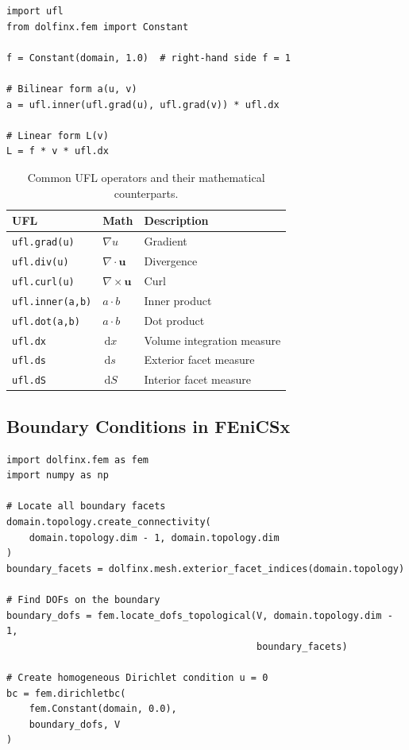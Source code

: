 \documentclass[11pt]{article}
\newcommand{\dx}{\,\mathrm{d}x}
\newcommand{\ds}{\,\mathrm{d}s}
\newcommand{\dS}{\,\mathrm{d}S}
\begin{document}
\begin{lstlisting}[style=python, caption={Expressing the Poisson variational form in UFL.}]
import ufl
from dolfinx.fem import Constant

f = Constant(domain, 1.0)  # right-hand side f = 1

# Bilinear form a(u, v)
a = ufl.inner(ufl.grad(u), ufl.grad(v)) * ufl.dx

# Linear form L(v)
L = f * v * ufl.dx
\end{lstlisting}

\begin{table}[ht]
  \centering
  \caption{Common UFL operators and their mathematical counterparts.}
  \label{tab:ufl}
  \begin{tabular}{lll}
    \toprule
    \textbf{UFL}            & \textbf{Math}               & \textbf{Description}         \\
    \midrule
    \texttt{ufl.grad(u)}    & $\nabla u$                  & Gradient                     \\
    \texttt{ufl.div(u)}     & $\nabla \cdot \mathbf{u}$   & Divergence                   \\
    \texttt{ufl.curl(u)}    & $\nabla \times \mathbf{u}$  & Curl                         \\
    \texttt{ufl.inner(a,b)} & $a \cdot b$                 & Inner product                \\
    \texttt{ufl.dot(a,b)}   & $a \cdot b$                 & Dot product                  \\
    \texttt{ufl.dx}         & $\dx$                       & Volume integration measure   \\
    \texttt{ufl.ds}         & $\ds$                       & Exterior facet measure       \\
    \texttt{ufl.dS}         & $\dS$                       & Interior facet measure       \\
    \bottomrule
  \end{tabular}
\end{table}

\subsection{Boundary Conditions in FEniCSx}

\begin{lstlisting}[style=python, caption={Applying homogeneous Dirichlet boundary conditions.}]
import dolfinx.fem as fem
import numpy as np

# Locate all boundary facets
domain.topology.create_connectivity(
    domain.topology.dim - 1, domain.topology.dim
)
boundary_facets = dolfinx.mesh.exterior_facet_indices(domain.topology)

# Find DOFs on the boundary
boundary_dofs = fem.locate_dofs_topological(V, domain.topology.dim - 1,
                                            boundary_facets)

# Create homogeneous Dirichlet condition u = 0
bc = fem.dirichletbc(
    fem.Constant(domain, 0.0),
    boundary_dofs, V
)
\end{lstlisting}
\end{document}
